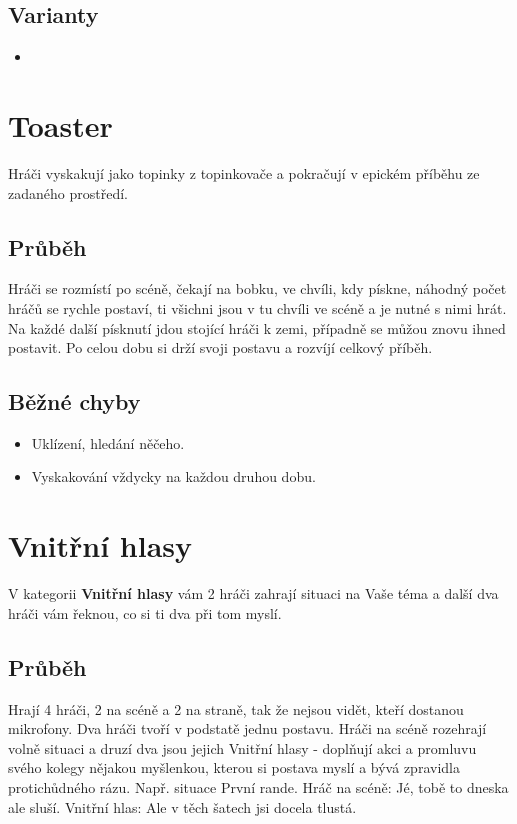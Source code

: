 \documentclass[main.tex]{subfiles}
\begin{document}
\subsection{ Varianty } \begin{itemize}
\item  {}
\end{itemize}
 
 
 
 
\needspace{5cm} \section{Toaster} \label{toaster}  
 
Hráči vyskakují jako topinky z topinkovače a pokračují v epickém příběhu ze zadaného prostředí. 
 
\subsection{ Průběh } Hráči se rozmístí po scéně, čekají na bobku, ve chvíli, kdy  pískne, náhodný počet hráčů se rychle postaví, ti všichni jsou v tu chvíli ve scéně a je nutné s nimi hrát.  Na každé další písknutí jdou stojící hráči k zemi, případně se můžou znovu ihned postavit. Po celou dobu si drží svoji postavu   a rozvíjí celkový příběh. 
 
 
\subsection{ Běžné chyby } \begin{itemize}
\item Uklízení, hledání něčeho.
\item Vyskakování vždycky na každou druhou dobu.
\end{itemize}
 
 
 
\needspace{5cm} \section{Vnitřní hlasy} \label{vnitřní hlasy}  
 
 
V kategorii \textbf{Vnitřní hlasy}{} vám 2 hráči zahrají situaci na Vaše téma a další dva hráči vám řeknou, co si ti dva při tom myslí. 
 
 
\subsection{Průběh} Hrají 4 hráči, 2 na scéně a 2 na straně, tak že nejsou vidět, kteří dostanou mikrofony.  Dva hráči tvoří v podstatě jednu postavu. Hráči na scéně rozehrají volně situaci a druzí dva jsou jejich Vnitřní hlasy - doplňují akci a promluvu svého kolegy nějakou myšlenkou, kterou si postava myslí a bývá zpravidla protichůdného rázu. Např. situace První rande. Hráč na scéně: Jé, tobě to dneska ale sluší. Vnitřní hlas: Ale v těch šatech jsi docela tlustá. 
 
\end{document}
